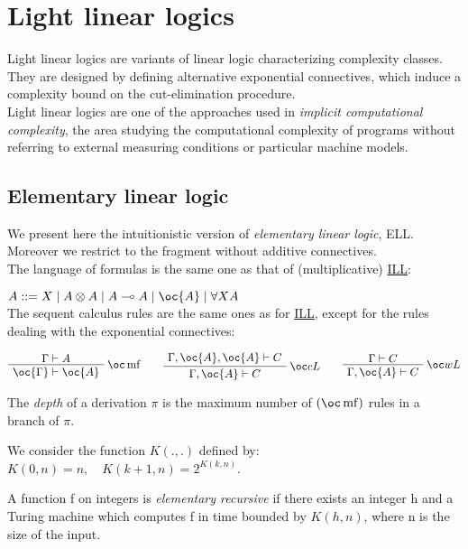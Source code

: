 \section{Light linear logics}\label{light-linear-logics}

Light linear logics are variants of linear logic characterizing
complexity classes. They are designed by defining alternative
exponential connectives, which induce a complexity bound on the
cut-elimination procedure.\\
Light linear logics are one of the approaches used in \emph{implicit
computational complexity}, the area studying the computational
complexity of programs without referring to external measuring
conditions or particular machine models.

\subsection{Elementary linear logic}\label{elementary-linear-logic}

We present here the intuitionistic version of \emph{elementary linear
logic}, ELL. Moreover we restrict to the fragment without additive
connectives.\\
The language of formulas is the same one as that of (multiplicative)
\href{Intuitionistic_linear_logic}{ILL}:

\(A ::= X \mid A\tens A \mid A\limp A  \mid \oc{A} \mid \forall X A\)\\
The sequent calculus rules are the same ones as for
\href{Intuitionistic_linear_logic}{ILL}, except for the rules dealing
with the exponential connectives:

\(\AxRule{\Gamma\vdash A}
\LabelRule{\oc\rulename{mf} }
\UnaRule{\oc{\Gamma}\vdash\oc{A}}
\DisplayProof
\qquad
\AxRule{\Gamma,\oc{A},\oc{A}\vdash C}
\LabelRule{\oc c L}
\UnaRule{\Gamma,\oc{A}\vdash C}
\DisplayProof
\qquad
\AxRule{\Gamma\vdash C}
\LabelRule{\oc w L}
\UnaRule{\Gamma,\oc{A}\vdash C}
\DisplayProof\)

The \emph{depth} of a derivation \(\pi\) is the maximum number of
\((\oc\rulename{mf})\) rules in a branch of \(\pi\).

We consider the function \(K(.,.)\) defined by:\\
\(K(0,n)=n, \quad K(k+1,n)=2^{K(k,n)}\).

A function f on integers is \emph{elementary recursive} if there exists
an integer h and a Turing machine which computes f in time bounded by
\(K(h,n)\), where n is the size of the input.

